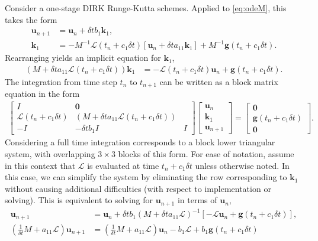 \documentclass[a4paper,10pt]{article}
\begin{document}
Consider a one-stage DIRK Runge-Kutta schemes. Applied to \eqref{eq:odeM}, this takes the form
%
\begin{align*}
\mathbf{u}_{n+1} & = \mathbf{u}_{n} + \delta tb_1\mathbf{k}_1 , \\
\mathbf{k}_1 & = -M^{-1}\mathcal{L}(t_n+c_1\delta t)\left[ \mathbf{u}_n + \delta t a_{11}\mathbf{k}_1\right] + M^{-1}\mathbf{g}(t_n+c_1\delta t).
\end{align*}
%
Rearranging yields an implicit equation for $\mathbf{k}_1$,
%
\begin{align*}
(M + \delta t a_{11}\mathcal{L}(t_n+c_1\delta t))\mathbf{k}_1 & = -\mathcal{L}(t_n+c_1\delta t) \mathbf{u}_n + \mathbf{g}(t_n+c_1\delta t).
\end{align*}
%
The integration from time step $t_n$ to $t_{n+1}$ can be written as a block matrix equation in the form
%
\begin{align*}
\begin{bmatrix} I & \mathbf{0} \\ \mathcal{L}(t_n+c_1\delta t) & (M +\delta t a_{11}\mathcal{L}(t_n+c_1\delta t)) & \\ -I & -\delta tb_1I & I \end{bmatrix}
	\begin{bmatrix} \mathbf{u}_n \\ \mathbf{k}_1 \\ \mathbf{u}_{n+1} \end{bmatrix} = 
	\begin{bmatrix} \mathbf{0} \\ \mathbf{g}(t_n+c_1\delta t) \\ \mathbf{0} \end{bmatrix}.
\end{align*}
%
Considering a full time integration corresponds to a block lower triangular system, with overlapping $3\times 3$ blocks
of this form. For ease of notation, assume in this context that $\mathcal{L}$ is evaluated at time $t_n+c_1\delta t$ unless otherwise
noted. In this case, we can simplify the system by eliminating the row corresponding to $\mathbf{k}_1$ without causing additional
difficulties (with respect to implementation or solving). This is equivalent to solving for $\mathbf{u}_{n+1}$ in terms of
$\mathbf{u}_n$,
%
\begin{align*}
\mathbf{u}_{n+1} & = \mathbf{u}_{n} + \delta tb_1(M + \delta t a_{11}\mathcal{L})^{-1}\left[ -\mathcal{L}\mathbf{u}_n + \mathbf{g}(t_n+c_1\delta t) \right], \\
(\tfrac{1}{\delta t} M + a_{11}\mathcal{L})\mathbf{u}_{n+1} & = (\tfrac{1}{\delta t} M + a_{11}\mathcal{L})\mathbf{u}_n - b_1\mathcal{L} + b_1\mathbf{g}(t_n+c_1\delta t)
\end{align*}
\end{document}
